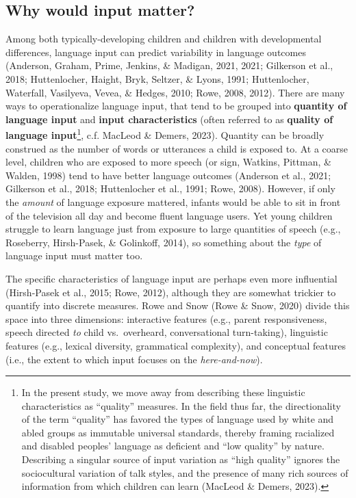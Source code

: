 \documentclass[
  man]{apa6}
\begin{document}
\hypertarget{why-would-input-matter}{%
\subsection{Why would input matter?}\label{why-would-input-matter}}

Among both typically-developing children and children with developmental differences, language input can predict variability in language outcomes (Anderson, Graham, Prime, Jenkins, \& Madigan, 2021, 2021; Gilkerson et al., 2018; Huttenlocher, Haight, Bryk, Seltzer, \& Lyons, 1991; Huttenlocher, Waterfall, Vasilyeva, Vevea, \& Hedges, 2010; Rowe, 2008, 2012). There are many ways to operationalize language input, that tend to be grouped into \textbf{quantity of language input} and \textbf{input characteristics} (often referred to as \textbf{quality of language input}\footnote{In the present study, we move away from describing these linguistic characteristics as ``quality'' measures. In the field thus far, the directionality of the term ``quality'' has favored the types of language used by white and abled groups as immutable universal standards, thereby framing racialized and disabled peoples' language as deficient and ``low quality'' by nature. Describing a singular source of input variation as ``high quality'' ignores the sociocultural variation of talk styles, and the presence of many rich sources of information from which children can learn (MacLeod \& Demers, 2023).}, c.f. MacLeod \& Demers, 2023). Quantity can be broadly construed as the number of words or utterances a child is exposed to. At a coarse level, children who are exposed to more speech (or sign, Watkins, Pittman, \& Walden, 1998) tend to have better language outcomes (Anderson et al., 2021; Gilkerson et al., 2018; Huttenlocher et al., 1991; Rowe, 2008). However, if only the \emph{amount} of language exposure mattered, infants would be able to sit in front of the television all day and become fluent language users. Yet young children struggle to learn language just from exposure to large quantities of speech (e.g., Roseberry, Hirsh-Pasek, \& Golinkoff, 2014), so something about the \emph{type} of language input must matter too.

The specific characteristics of language input are perhaps even more influential (Hirsh-Pasek et al., 2015; Rowe, 2012), although they are somewhat trickier to quantify into discrete measures. Rowe and Snow (Rowe \& Snow, 2020) divide this space into three dimensions: interactive features (e.g., parent responsiveness, speech directed \emph{to} child vs.~overheard, conversational turn-taking), linguistic features (e.g., lexical diversity, grammatical complexity), and conceptual features (i.e., the extent to which input focuses on the \emph{here-and-now}).
\end{document}
